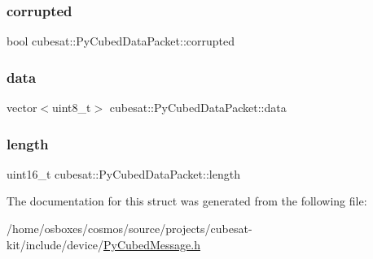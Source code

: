 \subsubsection{\texorpdfstring{corrupted}{corrupted}}
{\footnotesize\ttfamily bool cubesat\+::\+Py\+Cubed\+Data\+Packet\+::corrupted}

\mbox{\label{structcubesat_1_1PyCubedDataPacket_a07fc6be7a5ae0f4ccee608fb07264e7e}} 
\subsubsection{\texorpdfstring{data}{data}}
{\footnotesize\ttfamily vector$<$uint8\+\_\+t$>$ cubesat\+::\+Py\+Cubed\+Data\+Packet\+::data}

\mbox{\label{structcubesat_1_1PyCubedDataPacket_a1f7624cbfec16d1c0eab76745589fe44}} 
\subsubsection{\texorpdfstring{length}{length}}
{\footnotesize\ttfamily uint16\+\_\+t cubesat\+::\+Py\+Cubed\+Data\+Packet\+::length}



The documentation for this struct was generated from the following file\+:\begin{DoxyCompactItemize}
\item 
/home/osboxes/cosmos/source/projects/cubesat-\/kit/include/device/\hyperlink{PyCubedMessage_8h}{Py\+Cubed\+Message.\+h}\end{DoxyCompactItemize}
